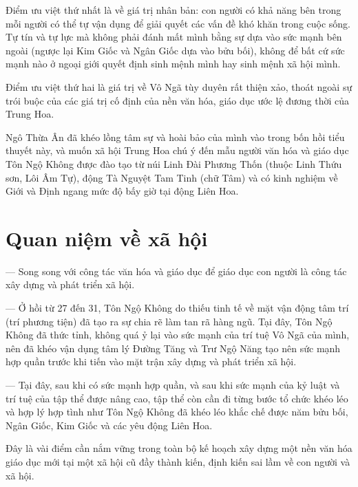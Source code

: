 Điểm ưu việt thứ nhất là về giá trị nhân bản: con người có khả năng bên trong mỗi người có thể tự vận dụng để giải quyết các vấn đề khó khăn trong cuộc sống. Tự tín và tự lực mà không phải đánh mất mình bằng sự dựa vào sức mạnh bên ngoài (ngược lại Kim Giốc và Ngân Giốc dựa vào bửu bối), không để bất cứ sức mạnh nào ở ngoại giới quyết định sinh mệnh mình hay sinh mệnh xã hội mình.

Điểm ưu việt thứ hai là giá trị về Vô Ngã tùy duyên rất thiện xảo, thoát ngoài sự trói buộc của các giá trị cố định của nền văn hóa, giáo dục ước lệ đương thời của Trung Hoa.

Ngô Thừa Ân đã khéo lồng tâm sự và hoài bảo của mình vào trong bốn hồi tiểu thuyết này, và muốn xã hội Trung Hoa chú ý đến mẫu người văn hóa và giáo dục Tôn Ngộ Không được đào tạo từ núi Linh Đài Phương Thốn (thuộc Linh Thứu sơn, Lôi Âm Tự), động Tà Nguyệt Tam Tinh (chữ Tâm) và có kinh nghiệm về Giới và Định ngang mức độ bấy giờ tại động Liên Hoa.

\section{Quan niệm về xã hội} %
\label{sec:33_34_xa_hoi}

— Song song với công tác văn hóa và giáo dục để giáo dục con người là công tác xây dựng và phát triển xã hội.

— Ở hồi từ 27 đến 31, Tôn Ngộ Không do thiếu tinh tế về mặt vận động tâm trí (trí phương tiện) đã tạo ra sự chia rẽ làm tan rã hàng ngũ. Tại đây, Tôn Ngộ Không đã thức tỉnh, không quá ỷ lại vào sức mạnh của trí tuệ Vô Ngã của mình, nên đã khéo vận dụng tâm lý Đường Tăng và Trư Ngộ Năng tạo nên sức mạnh hợp quần trước khi tiến vào mặt trận xây dựng và phát triển xã hội.

— Tại đây, sau khi có sức mạnh hợp quần, và sau khi sức mạnh của kỷ luật và trí tuệ của tập thể được nâng cao, tập thể còn cần đi từng bước tổ chức khéo léo và hợp lý hợp tình như Tôn Ngộ Không đã khéo léo khắc chế được năm bửu bối, Ngân Giốc, Kim Giốc và các yêu động Liên Hoa.

Đây là vài điểm cần nắm vững trong toàn bộ kế hoạch xây dựng một nền văn hóa giáo dục mới tại một xã hội cũ đầy thành kiến, định kiến sai lầm về con người và xã hội.
